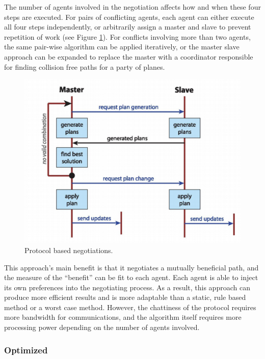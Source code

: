\documentclass[conference]{IEEEtran}
\begin{document}
The number of agents involved in the negotiation affects how and when these four steps are executed. For pairs of conflicting agents, each agent can either execute all four steps independently, or arbitrarily assign a master and slave to prevent repetition of work (see Figure \ref{fig:07SislakMaster}). For conflicts involving more than two agents, the same pair-wise algorithm can be applied iteratively, or the master slave approach can be expanded to replace the master with a coordinator responsible for finding collision free paths for a party of planes.

\begin{figure}[h]
	\includegraphics [width=1\columnwidth] {07SislakMasterSlave}
	\caption{Protocol based negotiations. \cite{vsivslak2008agentfly}}
	\label{fig:07SislakMaster}
\end{figure}


This approach’s main benefit is that it negotiates a mutually beneficial path, and the measure of the “benefit” can be fit to each agent. Each agent is able to inject its own preferences into the negotiating process. As a result, this approach can produce more efficient results and is more adaptable than a static, rule based method or a worst case method. However, the chattiness of the protocol requires more bandwidth for communications, and the algorithm itself requires more processing power depending on the number of agents involved. 

\subsubsection{Optimized}
\end{document}
